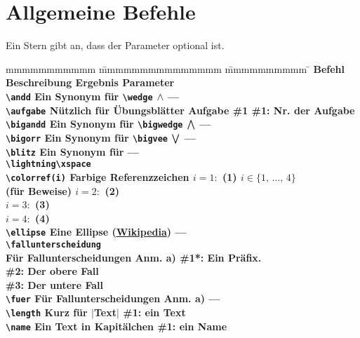 		\section{Allgemeine Befehle}
			Ein Stern gibt an, dass der Parameter optional ist. 
			\begin{tabbing}
				mmmmmmmmmmm			\= mmmmmmmmmmmmmmm							\= mmmmmmmmmm			\= \kill
				\bf Befehl			\> \bf Beschreibung							\> \bf Ergebnis 		\> \bf Parameter 				\\
				\verb|\andd|		\> Ein Synonym für \verb|\wedge|			\> $\wedge$ 				\> ---							\\
				\verb|\aufgabe|		\> Nützlich für Übungsblätter				\> Aufgabe \#1 			\> \#1: Nr. der Aufgabe 		\\
				\verb|\bigandd|		\> Ein Synonym für \verb|\bigwedge|			\> $\bigwedge$ 			\> --- 							\\
				\verb|\bigorr|		\> Ein Synonym für \verb|\bigvee|			\> $\bigvee$ 			\> --- 							\\
				\verb|\blitz|		\> Ein Synonym für							\> \lightning\xspace 	\> ---							\\
									\> \verb|\lightning\xspace|																			\\
				\verb|\colorref(i)|	\> Farbige Referenzzeichen					\> $i=1:$ (1)	\> $i \in \{1, \, \ldots, \, 4\}$	\\
									\>(\zb für Beweise)							\> $i=2:$ \colorref(2)										\\
									\>											\> $i=3:$ (3)										\\
									\>											\> $i=4:$ (4)										\\
				\verb|\ellipse|		\> Eine Ellipse	 (\href{https://de.wikipedia.org/wiki/Auslassungspunkte}{Wikipedia})
									\> \ellipse				\> ---							\\
				\verb|\fallunterscheidung|\\
									\> Für Fallunterscheidungen					\> Anm. a)				\> \#1*: Ein Präfix.			\\
									\>											\>						\> \#2: Der obere Fall			\\
									\>											\>						\> \#3: Der untere Fall			\\
				\verb|\fuer|		\> Für Fallunterscheidungen					\> Anm. a)				\> ---							\\
				\verb|\length|		\> Kurz für $|$Text$|$						\> \length{Text}		\> \#1: ein Text				\\
				\verb|\name|		\> Ein Text in Kapitälchen					\> \name{Der Autor}		\> \#1: ein Name				\\

\end{tabbing}
